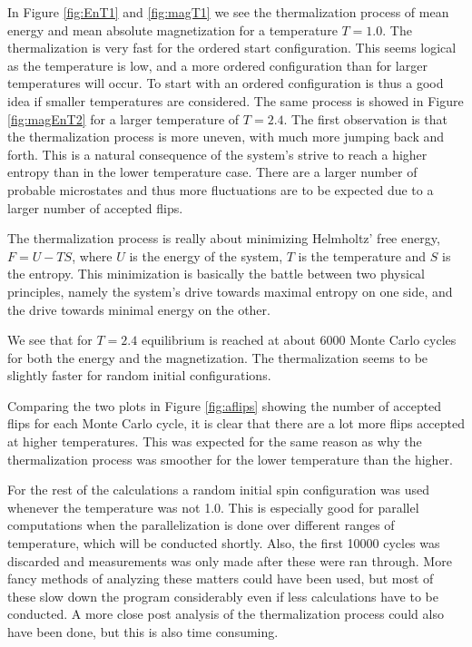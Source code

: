 \documentclass[11pt, a4paper]{article}
\begin{document}
In Figure \ref{fig:EnT1} and \ref{fig:magT1} we see the thermalization process of mean energy and mean absolute magnetization for a temperature $T=1.0$. The thermalization is very fast for the ordered start configuration. This seems logical as the temperature is low, and a more ordered configuration than for larger temperatures will occur. To start with an ordered configuration is thus a good idea if smaller temperatures are considered.
The same process is showed in Figure \ref{fig:magEnT2} for a larger temperature of $T=2.4$. The first observation is that the thermalization process is more uneven, with much more jumping back and forth. This is a natural consequence of the system's strive to reach a higher entropy than in the lower temperature case. There are a larger number of probable microstates and thus more fluctuations are to be expected due to a larger number of accepted flips.

The thermalization process is really about minimizing Helmholtz' free energy, $F=U-TS$, where $U$ is the energy of the system, $T$ is the temperature and $S$ is the entropy. This minimization is basically the battle between two physical principles, namely the system's drive towards maximal entropy on one side, and the drive towards minimal energy on the other.

We see that for $T=2.4$ equilibrium is reached at about 6000 Monte Carlo cycles for both the energy and the magnetization. The thermalization seems to be slightly faster for random initial configurations.

Comparing the two plots in Figure \ref{fig:aflips} showing the number of accepted flips for each Monte Carlo cycle, it is clear that there are a lot more flips accepted at higher temperatures. This was expected for the same reason as why the thermalization process was smoother for the lower temperature than the higher.

For the rest of the calculations a random initial spin configuration was used whenever the temperature was not 1.0. This is especially good for parallel computations when the parallelization is done over different ranges of temperature, which will be conducted shortly. Also, the first 10000 cycles was discarded and measurements was only made after these were ran through. More fancy methods of analyzing these matters could have been used, but most of these slow down the program considerably even if less calculations have to be conducted. A more close post analysis of the thermalization process could also have been done, but this is also time consuming. 
 
\end{document}
